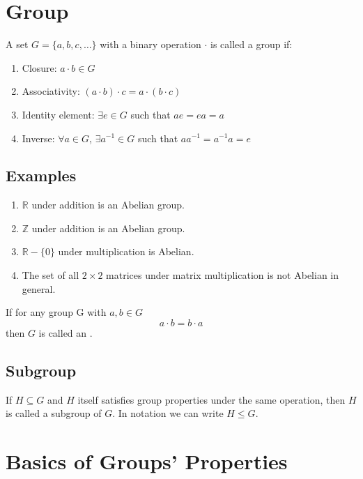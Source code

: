\documentclass[a4paper,12pt]{article}
\theoremstyle{definition}
\begin{document}
\section{Group}

A set $G = \{a,b,c,\dots\}$ with a binary operation $\cdot$
is called a group if:

\begin{enumerate}
    \item Closure: $a \cdot b \in G$
    \item Associativity: $(a \cdot b) \cdot c = a \cdot (b \cdot c)$
    \item Identity element: $\exists e \in G$ such that $ae = ea = a$
    \item Inverse: $\forall a \in G$, $\exists a^{-1} \in G$ such that $aa^{-1} = a^{-1}a = e$
\end{enumerate}

\subsection{Examples}

\begin{enumerate}
    \item $\mathbb{R}$ under addition is an Abelian group.
    \item $\mathbb{Z}$ under addition is an Abelian group.
    \item $\mathbb{R} - \{0\}$ under multiplication is Abelian.
    \item The set of all $2 \times 2$ matrices under matrix multiplication 
          is not Abelian in general.
\end{enumerate}

\begin{enlight}[green]{\bulb}
    \tcblower
    If for any group G with $a,b \in G$
    \[
    a \cdot b = b \cdot a
    \]
    then $G$ is called an .
\end{enlight}

\subsection{Subgroup}

If $H \subseteq G$ and $H$ itself satisfies group properties under
the same operation, then $H$ is called a subgroup of $G$. In notation we can write $H \leq G$.

\section{Basics of Groups' Properties}
\end{document}
